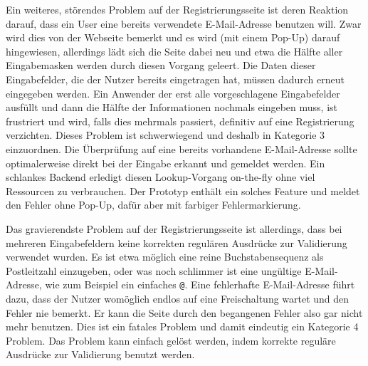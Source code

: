 \label{prob:reg:popup}
{ Ein weiteres, störendes Problem auf der Registrierungsseite ist deren Reaktion darauf, dass ein User eine bereits verwendete E-Mail-Adresse benutzen will. Zwar wird dies von der Webseite bemerkt und es wird (mit einem Pop-Up) darauf hingewiesen, allerdings lädt sich die Seite dabei neu und etwa die Hälfte aller Eingabemasken werden durch diesen Vorgang geleert. Die Daten dieser Eingabefelder, die der Nutzer bereits eingetragen hat, müssen dadurch erneut eingegeben werden.
}
{ Ein Anwender der erst alle vorgeschlagene Eingabefelder ausfüllt und dann die Hälfte der Informationen nochmals eingeben muss, ist frustriert und wird, falls dies mehrmals passiert, definitiv auf eine Registrierung verzichten. Dieses Problem ist schwerwiegend und deshalb in Kategorie 3 einzuordnen.
}
{ Die Überprüfung auf eine bereits vorhandene E-Mail-Adresse sollte optimalerweise direkt bei der Eingabe erkannt und gemeldet werden. Ein schlankes Backend erledigt diesen Lookup-Vorgang on-the-fly ohne viel Ressourcen zu verbrauchen. Der Prototyp enthält ein solches Feature und meldet den Fehler ohne Pop-Up, dafür aber mit farbiger Fehlermarkierung.
}  
\label{prob:reg:vergivenmail}


{ Das gravierendste Problem auf der Registrierungsseite ist allerdings, dass bei mehreren Eingabefeldern keine korrekten regulären Ausdrücke zur Validierung verwendet wurden. Es ist etwa möglich eine reine Buchstabensequenz als Postleitzahl einzugeben, oder was noch schlimmer ist eine ungültige E-Mail-Adresse, wie zum Beispiel ein einfaches \glqq \texttt{@}\grqq.
}
{ Eine fehlerhafte E-Mail-Adresse führt dazu, dass der Nutzer womöglich endlos auf eine Freischaltung wartet und den Fehler nie bemerkt. Er kann die Seite durch den begangenen Fehler also gar nicht mehr benutzen. Dies ist ein fatales Problem und damit eindeutig ein Kategorie 4 Problem.}
{ Das Problem kann einfach gelöst werden, indem korrekte reguläre Ausdrücke zur Validierung benutzt werden.
} 
\label{prob:reg:regex}

